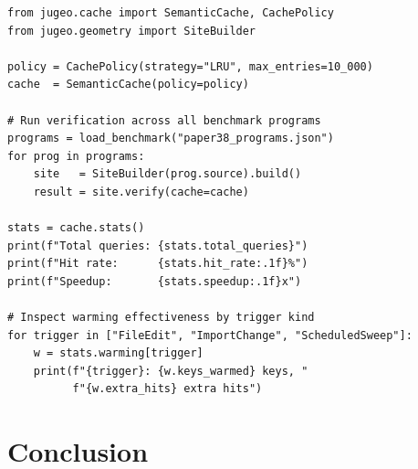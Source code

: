 \documentclass[11pt]{article}
\begin{document}
\begin{lstlisting}[style=jugeo-python,
  caption={Measuring cache hit rates and warming effectiveness across
           the benchmark suite.},
  label={lst:cache-benchmark}]
from jugeo.cache import SemanticCache, CachePolicy
from jugeo.geometry import SiteBuilder

policy = CachePolicy(strategy="LRU", max_entries=10_000)
cache  = SemanticCache(policy=policy)

# Run verification across all benchmark programs
programs = load_benchmark("paper38_programs.json")
for prog in programs:
    site   = SiteBuilder(prog.source).build()
    result = site.verify(cache=cache)

stats = cache.stats()
print(f"Total queries: {stats.total_queries}")
print(f"Hit rate:      {stats.hit_rate:.1f}%")
print(f"Speedup:       {stats.speedup:.1f}x")

# Inspect warming effectiveness by trigger kind
for trigger in ["FileEdit", "ImportChange", "ScheduledSweep"]:
    w = stats.warming[trigger]
    print(f"{trigger}: {w.keys_warmed} keys, "
          f"{w.extra_hits} extra hits")
\end{lstlisting}

\section{Conclusion}\label{sec:conclusion}
\end{document}
